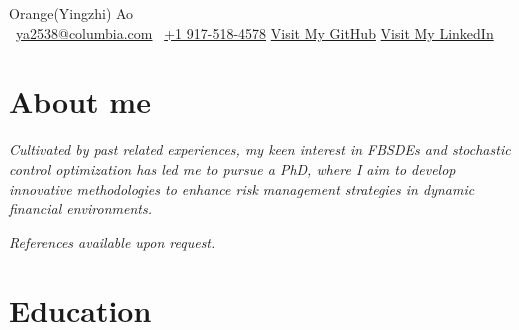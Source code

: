 \documentclass[a4paper]{article}
\newcommand{\org}{\color{org}}
\begin{document}
\begin{center}      
    {\fontsize{28}{28}\selectfont Orange(Yingzhi) Ao} \\ \vspace{5pt}
    {\org\faEnvelope[regular]}\ \href{mailto:ya2538@columbia.edu}{ya2538@columbia.com} \hfill
    {\org{}}\ \href{tel:+1 9175184578}{+1 917-518-4578} \hfill
    {\org\faGithub} \href{https://github.com/OrangeAoo}{Visit My GitHub}  \hfill
    {\org\faLinkedin} \href{http://linkedin.com/in/orange-ao}{Visit My LinkedIn}
\end{center}

\section{About me}  %

\textit{Cultivated by past related experiences, my keen interest in FBSDEs and stochastic control optimization has led me to pursue a PhD, where I aim to develop innovative methodologies to enhance risk management strategies in dynamic financial environments.}

{\org \itshape References available upon request.}

\section{Education}  %
\end{document}
